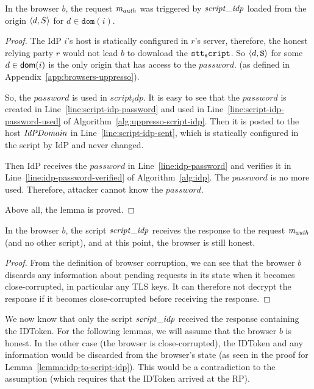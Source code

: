   \begin{lemma}\label{lemma:script-idp-trigger-request} %
    In the browser $b$, the request $\mathit{m_{auth}}$ was triggered by $\mathit{script\_idp}$ loaded from the origin $\langle {{}d, S} \rangle$ for $d \in \mathtt{dom}(i)$.
  \end{lemma}
  \begin{proof}
	The IdP $i$'s host is statically configured in $r$'s server, therefore, the honest relying party $r$ would not lead $b$ to download the $\mathtt{stt_script}$.  So $\langle d,\mathtt{S}\rangle$ for some $d \in \mathsf{dom}(i)$ is the only origin that has access to the $password$. (as defined in Appendix~\ref{app:browsers-uppresso}).
	
  So, the $password$ is used in $script_idp$. It is easy to see that the $password$ is created in Line~\ref{line:script-idp-password} and used in Line~\ref{line:script-idp-password-used} of Algorithm~\ref{alg:uppresso-script-idp}. Then it is posted to the host $\mathit{IdPDomain}$ in Line~\ref{line:script-idp-sent}, which is statically configured in the script by IdP and never changed. 
  
  Then IdP receives the $password$ in Line~\ref{line:idp-password} and verifies it in Line~\ref{line:idp-password-verified} of Algorithm~\ref{alg:idp}. The $password$ is no more used. Therefore, attacker cannot know the $password$.
  
  Above all, the lemma is proved.
  \end{proof}


  
  \begin{lemma} \label{lemma:idp-to-script-idp} %
    In the browser $b$, the script $\mathit{script\_idp}$ receives the response to the request $\mathit{m_{auth}}$ (and no other script), and at this point, the browser is still honest.
  \end{lemma}
  \begin{proof}
    From the definition of browser corruption, we can see that the browser $b$ discards any information about pending requests in its state when it becomes close-corrupted, in particular any TLS keys. It can therefore not decrypt the response if it becomes close-corrupted before receiving the response.
  \end{proof}
  
  We now know that only the script $\mathit{script\_idp}$ received 
  the response containing the IDToken. For the following lemmas, 
  we will assume that the browser $b$ is honest. In the other 
  case (the browser is close-corrupted), the IDToken and any 
  information would be discarded from the browser's state 
  (as seen in the proof for Lemma~\ref{lemma:idp-to-script-idp}). 
  This would be a contradiction to the assumption 
  (which requires that the IDToken arrived at the RP).
  
